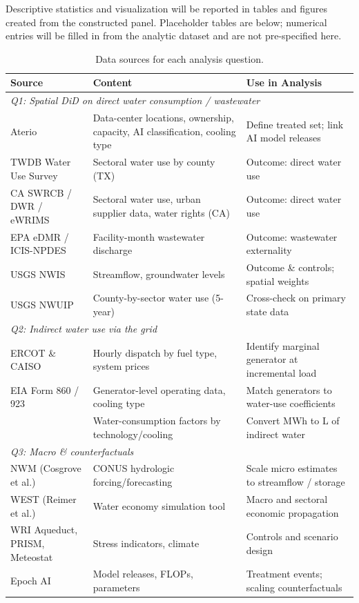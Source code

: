 \documentclass[11pt, letterpaper]{article}
\begin{document}
Descriptive statistics and visualization will be reported in tables and figures created from the constructed panel. Placeholder tables are below; numerical entries will be filled in from the analytic dataset and are not pre-specified here.

\begin{table}[htbp]
\centering
\caption{Data sources for each analysis question.}
\label{tab:DataSources}
\begin{threeparttable}
\begin{tabularx}{\linewidth}{lXX}
\toprule
\textbf{Source} & \textbf{Content} & \textbf{Use in Analysis} \\
\midrule
\multicolumn{3}{l}{\textit{Q1: Spatial DiD on direct water consumption / wastewater}} \\
\midrule
Aterio & Data-center locations, ownership, capacity, AI classification, cooling type & Define treated set; link AI model releases \\
TWDB Water Use Survey & Sectoral water use by county (TX) & Outcome: direct water use \\
CA SWRCB / DWR / eWRIMS & Sectoral water use, urban supplier data, water rights (CA) & Outcome: direct water use \\
EPA eDMR / ICIS-NPDES & Facility-month wastewater discharge & Outcome: wastewater externality \\
USGS NWIS & Streamflow, groundwater levels & Outcome \& controls; spatial weights \\
USGS NWUIP & County-by-sector water use (5-year) & Cross-check on primary state data \\
\midrule
\multicolumn{3}{l}{\textit{Q2: Indirect water use via the grid}} \\
\midrule
ERCOT \& CAISO & Hourly dispatch by fuel type, system prices & Identify marginal generator at incremental load \\
EIA Form 860 / 923 & Generator-level operating data, cooling type & Match generators to water-use coefficients \\
\citet{jin2019water} & Water-consumption factors by technology/cooling & Convert MWh to L of indirect water \\
\midrule
\multicolumn{3}{l}{\textit{Q3: Macro \& counterfactuals}} \\
\midrule
NWM (Cosgrove et al.) & CONUS hydrologic forcing/forecasting & Scale micro estimates to streamflow / storage \\
WEST (Reimer et al.) & Water economy simulation tool & Macro and sectoral economic propagation \\
WRI Aqueduct, PRISM, Meteostat & Stress indicators, climate & Controls and scenario design \\
Epoch AI & Model releases, FLOPs, parameters & Treatment events; scaling counterfactuals \\
\bottomrule
\end{tabularx}
\end{threeparttable}
\end{table}
\end{document}
